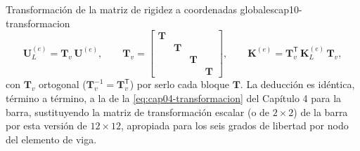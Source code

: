 \begin{ecnimportante}{Transformación de la matriz de rigidez a coordenadas globales}{cap10-transformacion}
\[
\bm U_L^{(e)} = \bm T_v\,\bm U^{(e)}, \qquad \bm T_v = \begin{bmatrix}\bm T&&&\\&\bm T&&\\&&\bm T&\\&&&\bm T\end{bmatrix}, \qquad
\bm K^{(e)} = \bm T_v^{\mathsf T}\,\bm K_L^{(e)}\,\bm T_v ,
\]
con $\bm T_v$ ortogonal ($\bm T_v^{-1}=\bm T_v^{\mathsf T}$) por serlo cada bloque $\bm T$. La deducción es idéntica, término a término, a la de la \cref{eq:cap04-transformacion} del Capítulo 4 para la barra, sustituyendo la matriz de transformación escalar (o de $2\times2$) de la barra por esta versión de $12\times12$, apropiada para los seis grados de libertad por nodo del elemento de viga.
\end{ecnimportante}

